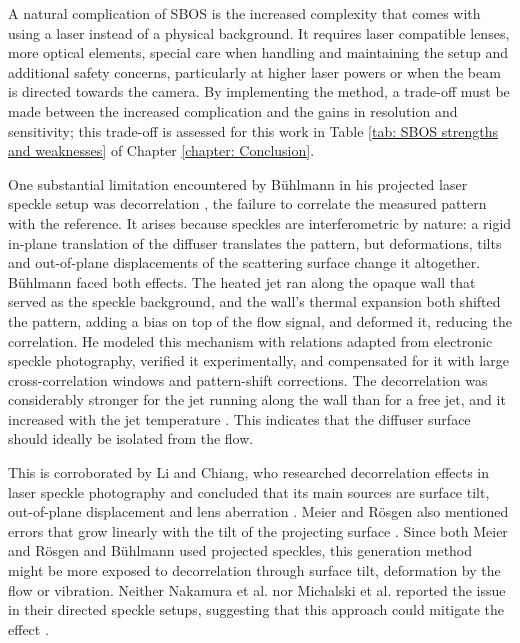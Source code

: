 \par A natural complication of SBOS is the increased complexity that comes with using a laser instead of a physical background. It requires laser compatible lenses, more optical elements, special care when handling and maintaining the setup and additional safety concerns, particularly at higher laser powers or when the beam is directed towards the camera. By implementing the method, a trade-off must be made between the increased complication and the gains in resolution and sensitivity; this trade-off is assessed for this work in Table \ref{tab: SBOS strengths and weaknesses} of Chapter \ref{chapter: Conclusion}.

\par One substantial limitation encountered by Bühlmann in his projected laser speckle setup was decorrelation \cite{Buhlmann2020}, the failure to correlate the measured pattern with the reference. It arises because speckles are interferometric by nature: a rigid in-plane translation of the diffuser translates the pattern, but deformations, tilts and out-of-plane displacements of the scattering surface change it altogether. Bühlmann faced both effects. The heated jet ran along the opaque wall that served as the speckle background, and the wall's thermal expansion both shifted the pattern, adding a bias on top of the flow signal, and deformed it, reducing the correlation. He modeled this mechanism with relations adapted from electronic speckle photography, verified it experimentally, and compensated for it with large cross-correlation windows and pattern-shift corrections. The decorrelation was considerably stronger for the jet running along the wall than for a free jet, and it increased with the jet temperature \cite{Buhlmann2020}. This indicates that the diffuser surface should ideally be isolated from the flow.

\par This is corroborated by Li and Chiang, who researched decorrelation effects in laser speckle photography and concluded that its main sources are surface tilt, out-of-plane displacement and lens aberration \cite{Li&CHiang1986}. Meier and Rösgen also mentioned errors that grow linearly with the tilt of the projecting surface \cite{Meier&Roesgen2013}. Since both Meier and Rösgen and Bühlmann \cite{Meier&Roesgen2013, Buhlmann2020} used projected speckles, this generation method might be more exposed to decorrelation through surface tilt, deformation by the flow or vibration. Neither Nakamura et al. nor Michalski et al. reported the issue in their directed speckle setups, suggesting that this approach could mitigate the effect \cite{Nakamura2021, Michalski2018}.

